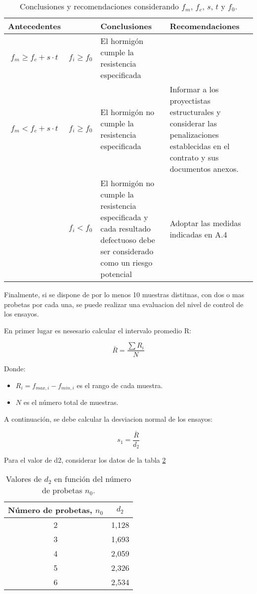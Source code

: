 \begin{table}[H]
\centering
\begin{tabular}{|c|c|p{6cm}|p{6cm}|}
\hline
\textbf{Antecedentes} &  & \textbf{Conclusiones} & \textbf{Recomendaciones} \\ \hline
$f_{m} \geq f_{c} + s \cdot t$ & $f_{i} \geq f_{0}$ & 
El hormigón cumple la resistencia especificada & \\ \hline

$f_{m} < f_{c} + s \cdot t$ & $f_{i} \geq f_{0}$ & 
El hormigón no cumple la resistencia especificada & 
Informar a los proyectistas estructurales y considerar las penalizaciones establecidas en el contrato y sus documentos anexos. \\ \hline

 & $f_{i} < f_{0}$ & 
El hormigón no cumple la resistencia especificada y cada resultado defectuoso debe ser considerado como un riesgo potencial & 
Adoptar las medidas indicadas en A.4 \\ \hline
\end{tabular}
\caption{Conclusiones y recomendaciones considerando $f_{m}$, $f_{c}$, $s$, $t$ y $f_{0}$.}
\label{tab:conclusiones2}
\end{table}

Finalmente, si se dispone de por lo menos 10 muestras distitnas, con dos o mas probetas por cada una, se puede realizar una evaluacion del nivel de control de los ensayos.

En primer lugar es nesesario calcular el intervalo promedio R:

\begin{equation}
    \bar{R} = \frac{\sum R_i}{N}
\end{equation}

Donde:

\begin{itemize}
    \item $R_i = f_{max,i} - f_{min,i}$ es el rango de cada muestra.
    \item $N$ es el número total de muestras.
\end{itemize}

A continuación, se debe calcular la desviacion normal de los ensayos:

\begin{equation}
    s_1 = \frac{\bar{R}}{d_2}
\end{equation}

Para el valor de d2, considerar los datos de la tabla \ref{tab:d2}

\begin{table}[H]
\centering
\begin{tabular}{|c|c|}
\hline
\textbf{Número de probetas, $n_{0}$} & \textbf{$d_{2}$} \\ \hline
2 & 1,128 \\ \hline
3 & 1,693 \\ \hline
4 & 2,059 \\ \hline
5 & 2,326 \\ \hline
6 & 2,534 \\ \hline
\end{tabular}
\caption{Valores de $d_{2}$ en función del número de probetas $n_{0}$.}
\label{tab:d2}
\end{table}

